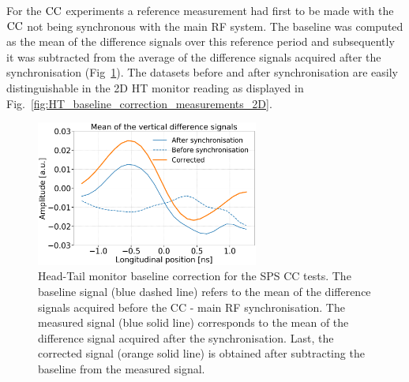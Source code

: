For the ${\mathrm{CC}}$ experiments a reference measurement had first to be made with the ${\mathrm{CC}}$ not being synchronous with the main RF system. The baseline was computed as the mean of the difference signals over this reference period and subsequently it was subtracted from the average of the difference signals acquired after the synchronisation (Fig~\ref{fig:HT_baseline_correction}). The datasets before and after synchronisation are easily distinguishable in the 2D HT monitor reading as displayed in Fig.~\ref{fig:HT_baseline_correction_measurements_2D}.


\begin{figure}[!h]
   \centering         
   \includegraphics[width=0.65\textwidth]{images/Ch4/HT_measures_vs_reference_vs_corrected__20180530_135105_baseline_correction_new_version_CC_post_processing.png}
       \caption{Head-Tail monitor baseline correction for the SPS CC tests. The baseline signal (blue dashed line) refers to the mean of the difference signals acquired before the CC - main RF synchronisation. The measured signal (blue solid line) corresponds to the mean of the difference signal acquired after the synchronisation. Last, the corrected signal (orange solid line) is obtained after subtracting the baseline from the measured signal.}
       \label{fig:HT_baseline_correction}
\end{figure}

